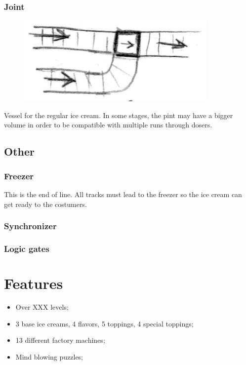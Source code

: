 \documentclass[a4paper]{scrartcl}
\begin{document}
        \subsubsection{Joint}
            \begin{minipage}[t][3em][t]{\textwidth}
                \begin{figure}
                    \vspace{-20pt}
                    \includegraphics[scale=1]{devices/joint}
                    \vspace{-20pt}
                \end{figure}

                Vessel for the regular ice cream. In some stages, the pint may have
                a bigger volume in order to be compatible with multiple runs through
                dosers.
            \end{minipage}

    \subsection{Other}
        \subsubsection{Freezer}
            This is the end of line. All tracks must lead to the freezer so the
            ice cream can get ready to the costumers.

        \subsubsection{Synchronizer}

        \subsubsection{Logic gates}

\section{Features}
    \begin{itemize}
        \item Over XXX levels;
        \item 3 base ice creams, 4 flavors, 5 toppings, 4 special toppings;
        \item 13 different factory machines;
        \item Mind blowing puzzles;
    \end{itemize}
\end{document}
